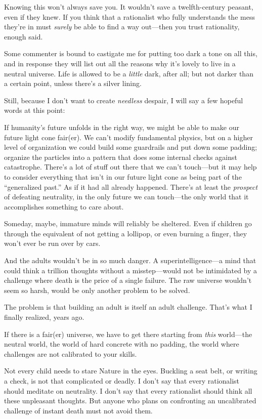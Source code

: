 {
 Knowing this won't always save you. It
wouldn't save a twelfth-century peasant, even if they
knew. If you think that a rationalist who fully understands the mess
they're in must \textit{surely} be able to find a way
out---then you trust rationality, enough said.}

{
 Some commenter is bound to castigate me for putting too dark a
tone on all this, and in response they will list out all the reasons
why it's lovely to live in a neutral universe. Life is
allowed to be a \textit{little} dark, after all; but not darker than a
certain point, unless there's a silver lining.}

{
 Still, because I don't want to create
\textit{needless} despair, I will say a few hopeful words at this
point:}

{
 If humanity's future unfolds in the right way, we
might be able to make our future light cone fair(er). We
can't modify fundamental physics, but on a higher level
of organization we could build some guardrails and put down some
padding; organize the particles into a pattern that does some internal
checks against catastrophe. There's a lot of stuff out
there that we can't touch---but it may help to consider
everything that isn't in our future light cone as being
part of the ``generalized past.'' As
if it had all already happened. There's at least the
\textit{prospect} of defeating neutrality, in the only future we can
touch---the only world that it accomplishes something to care about.}

{
 Someday, maybe, immature minds will reliably be sheltered. Even if
children go through the equivalent of not getting a lollipop, or even
burning a finger, they won't ever be run over by cars.}

{
 And the adults wouldn't be in so much danger. A
superintelligence---a mind that could think a trillion thoughts without
a misstep---would not be intimidated by a challenge where death is the
price of a single failure. The raw universe wouldn't
seem so harsh, would be only another problem to be solved.}

{
 The problem is that building an adult is itself an adult
challenge. That's what I finally realized, years ago.}

{
 If there is a fair(er) universe, we have to get there starting
from \textit{this} world---the neutral world, the world of hard
concrete with no padding, the world where challenges are not calibrated
to your skills.}

{
 Not every child needs to stare Nature in the eyes. Buckling a seat
belt, or writing a check, is not that complicated or deadly. I
don't say that every rationalist should meditate on
neutrality. I don't say that every rationalist should
think all these unpleasant thoughts. But anyone who plans on
confronting an uncalibrated challenge of instant death must not avoid
them.}

